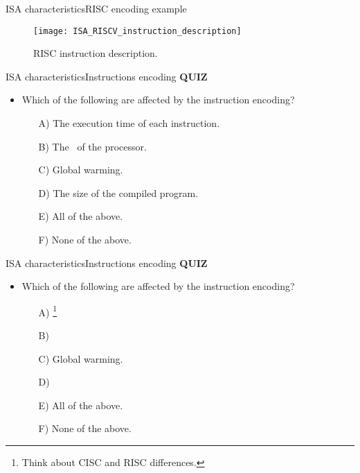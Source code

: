 \documentclass[]{slides}
\begin{document}
\begin{frame}{\acs{ISA} characteristics}{RISC encoding example}
\vspace{-8pt}
\begin{figure}
\centering
\texttt{[image: ISA\_RISCV\_instruction\_description]}
\vspace{-8pt}
\caption{RISC instruction description.}
\label{Figure:RISC_instruction_description}
\end{figure}    
\end{frame}

\begin{frame}{\acs{ISA} characteristics}{Instructions encoding}
  \textbf{\large{QUIZ}} \\
  \begin{itemize}
    \item Which of the following are affected by the instruction encoding?
    \begin{enumerate}
      \item[A)] The execution time of each instruction.
      \item[B)] The \uA~of the processor.
      \item[C)] Global warming.
      \item[D)] The size of the compiled program.
      \item[E)] All of the above.
      \item[F)] None of the above.
    \end{enumerate}   
  \end{itemize}
\end{frame}

\begin{frame}{\acs{ISA} characteristics}{Instructions encoding}
  \textbf{\large{QUIZ}} \\
  \begin{itemize}
    \item Which of the following are affected by the instruction encoding?
    \begin{enumerate}
      \item[A)] \footnote{Think about \ac{CISC} and \ac{RISC} differences.}
      \item[B)] 
      \item[C)] Global warming.
      \item[D)] 
      \item[E)] All of the above.
      \item[F)] None of the above.
    \end{enumerate}   
  \end{itemize}
\end{frame}
\end{document}
